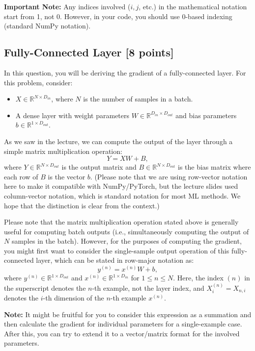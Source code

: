 \documentclass[lang=cn,11pt]{elegantbook}
\begin{document}
\textbf{Important Note:} Any indices involved ($i, j$, etc.) in the mathematical notation start from 1, not 0. However, in your code, you should use 0-based indexing (standard NumPy notation).

\subsection{Fully-Connected Layer [8 points]}
In this question, you will be deriving the gradient of a fully-connected layer. For this problem, consider:
\begin{itemize}
    \item $X \in \mathbb{R}^{N \times D_{in}}$, where $N$ is the number of samples in a batch.
    \item A dense layer with weight parameters $W \in \mathbb{R}^{D_{in} \times D_{out}}$ and bias parameters $b \in \mathbb{R}^{1 \times D_{out}}$.
\end{itemize}

As we saw in the lecture, we can compute the output of the layer through a simple matrix multiplication operation:
\begin{equation}
    Y = XW + B,
\end{equation}
where $Y \in \mathbb{R}^{N \times D_{out}}$ is the output matrix and $B \in \mathbb{R}^{N \times D_{out}}$ is the bias matrix where each row of $B$ is the vector $b$. (Please note that we are using row-vector notation here to make it compatible with NumPy/PyTorch, but the lecture slides used column-vector notation, which is standard notation for most ML methods. We hope that the distinction is clear from the context.)

Please note that the matrix multiplication operation stated above is generally useful for computing batch outputs (i.e., simultaneously computing the output of $N$ samples in the batch). However, for the purposes of computing the gradient, you might first want to consider the single-sample output operation of this fully-connected layer, which can be stated in row-major notation as:
\begin{equation}
    y^{(n)} = x^{(n)} W + b,
\end{equation}
where $y^{(n)} \in \mathbb{R}^{1 \times D_{out}}$ and $x^{(n)} \in \mathbb{R}^{1 \times D_{in}}$ for $1 \leq n \leq N$. Here, the index \((n)\) in the superscript denotes the $n$-th example, not the layer index, and $X^{(n)}_i = X_{n,i}$ denotes the $i$-th dimension of the $n$-th example $x^{(n)}$.

\textbf{Note:} It might be fruitful for you to consider this expression as a summation and then calculate the gradient for individual parameters for a single-example case. After this, you can try to extend it to a vector/matrix format for the involved parameters.
\end{document}
